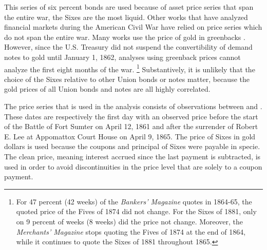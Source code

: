 \documentclass[11pt, oneside, article]{memoir}
\begin{document}

This series of six percent bonds are used because of asset price series that span the entire war, the Sixes are the most liquid.
Other works that have analyzed financial markets during the American Civil War have relied on price series which do not span the entire war.
Many works use the price of gold in greenbacks \parencites{McCandless1996,SmithSmith1997,WillardGuinnaneEtAl1996}.
However, since the U.S. Treasury did not suspend the convertibility of demand notes to gold until January 1, 1862, analyses using greenback prices cannot analyze the first eight months of the war.
\footnote{
  For 47 percent (42 weeks) of the \textit{Bankers' Magazine} quotes in 1864-65, the quoted price of the Fives of 1874 did not change. 
  For the Sixes of 1881, only on 9 percent of weeks (8 weeks) did the price not change.
  Moreover, the \textit{Merchants' Magazine} stops quoting the Fives of 1874 at the end of 1864, while it continues to quote the Sixes of 1881 throughout 1865.
}
Substantively, it is unlikely that the choice of the Sixes relative to other Union bonds or notes matter, because the gold prices of all Union bonds and notes are all highly correlated.

The price series that is used in the analysis consists of \AcwSixesNobs{} observations between \AcwSixesStart{} and \AcwSixesEnd{}.
These dates are respectively the first day with an observed price before the start of the Battle of Fort Sumter on April 12, 1861  and after the surrender of Robert E. Lee at Appomattox Court House on April 9, 1865.
The price of Sixes in gold dollars is used because the coupons and principal of Sixes were payable in specie.
The clean price, meaning interest accrued since the last payment is subtracted, is used in order to avoid discontinuities in the price level that are solely to a coupon payment.

\end{document}
